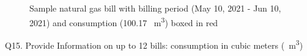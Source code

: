 \documentclass[12pt]{article}
\begin{document}
\begin{figure}[H]
\begin{center}
\caption{Sample natural gas bill with billing period (May 10, 2021 - Jun 10, 2021) and consumption (100.17 \SI{}{m^3}) boxed in red}
\label{Enbridge}
\end{center}
\end{figure}

\pagebreak

Q15. Provide Information on up to 12 bills: consumption in cubic meters (\SI{}{m^3})
\end{document}

